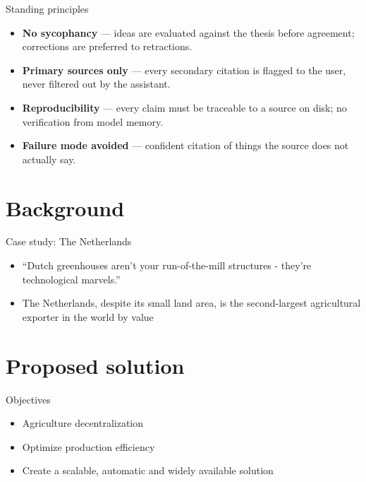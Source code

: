 \documentclass{beamer}
\begin{document}
\begin{frame}{Standing principles}
    \begin{itemize}
        \item \textbf{No sycophancy} --- ideas are evaluated against the thesis before agreement; corrections are preferred to retractions. \vspace{6mm}
        \item \textbf{Primary sources only} --- every secondary citation is flagged to the user, never filtered out by the assistant. \vspace{6mm}
        \item \textbf{Reproducibility} --- every claim must be traceable to a source on disk; no verification from model memory. \vspace{6mm}
        \item \textbf{Failure mode avoided} --- confident citation of things the source does not actually say.
    \end{itemize}
\end{frame}


\section{Background}

\begin{frame}{Case study: The Netherlands}
    \begin{itemize}
        \item ``Dutch greenhouses aren't your run-of-the-mill structures - they're technological marvels.'' \cite{hbs2024} \vspace{10mm}
        \item The Netherlands, despite its small land area, is the second-largest agricultural exporter in the world by value \cite{ITA2026_Netherlands_Agriculture}
    \end{itemize}
\end{frame}

\section{Proposed solution}

\begin{frame}{Objectives}
    \begin{itemize}
        \item Agriculture decentralization \vspace{10mm}
        \item Optimize production efficiency \vspace{10mm}
        \item Create a scalable, automatic and widely available solution \vspace{10mm}
    \end{itemize}
\end{frame}
\end{document}
